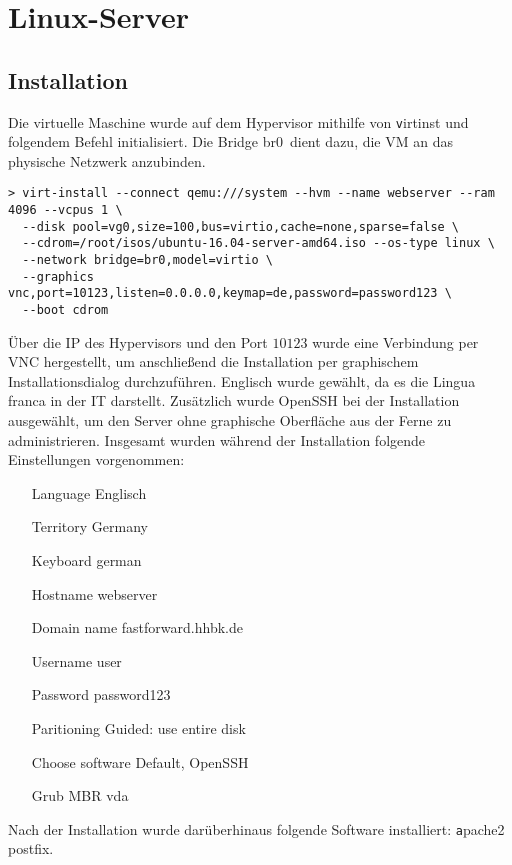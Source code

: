 \section{Linux-Server}

\subsection{Installation}

Die virtuelle Maschine wurde auf dem Hypervisor mithilfe von {\texttt virtinst} und folgendem Befehl initialisiert. Die Bridge \ql br0\qr\ dient dazu, die VM an das physische Netzwerk anzubinden.\newline

\begin{lstlisting}[numbers=none]
> virt-install --connect qemu:///system --hvm --name webserver --ram 4096 --vcpus 1 \
  --disk pool=vg0,size=100,bus=virtio,cache=none,sparse=false \
  --cdrom=/root/isos/ubuntu-16.04-server-amd64.iso --os-type linux \
  --network bridge=br0,model=virtio \
  --graphics vnc,port=10123,listen=0.0.0.0,keymap=de,password=password123 \
  --boot cdrom
\end{lstlisting}

Über die IP des Hypervisors und den Port $10123$ wurde eine Verbindung per VNC hergestellt, um anschließend die Installation per graphischem Installationsdialog durchzuführen. Englisch wurde gewählt, da es die Lingua franca in der IT darstellt. Zusätzlich wurde OpenSSH bei der Installation ausgewählt, um den Server ohne graphische Oberfläche aus der Ferne zu administrieren. Insgesamt wurden während der Installation folgende Einstellungen vorgenommen:
\begin{itemize}[leftmargin=+1in]
	\item[Language] Englisch
	\item[Territory] Germany
	\item[Keyboard] german
	\item[Hostname] webserver
	\item[Domain name] fastforward.hhbk.de
	\item[Username] user
	\item[Password] password123
	\item[Paritioning] Guided: use entire disk
	\item[Choose software] Default, OpenSSH
	\item[Grub MBR] vda
\end{itemize}

Nach der Installation wurde darüberhinaus folgende Software installiert: {\texttt apache2 postfix}.

